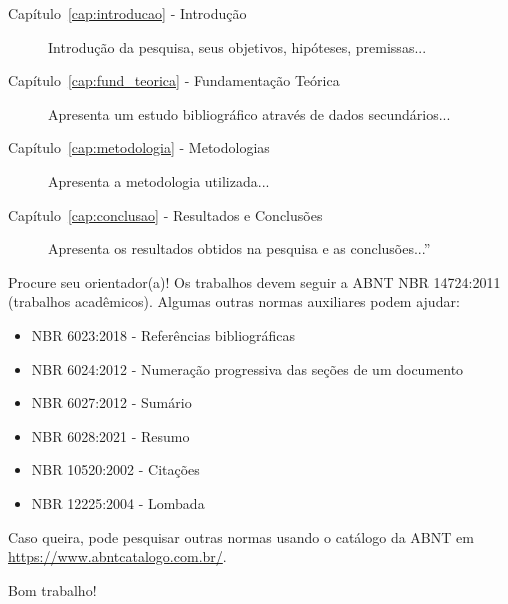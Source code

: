 \begin{description}
    \item[Capítulo~\ref{cap:introducao} - Introdução] Introdução da pesquisa, seus objetivos, hipóteses, premissas...
    
    \item[Capítulo~\ref{cap:fund_teorica} - Fundamentação Teórica] Apresenta um estudo bibliográfico através de dados secundários...
    
    \item[Capítulo~\ref{cap:metodologia} - Metodologias] Apresenta a metodologia utilizada...
    
    \item[Capítulo~\ref{cap:conclusao} - Resultados e Conclusões] Apresenta os resultados obtidos na pesquisa e as conclusões...''
\end{description}

Procure seu orientador(a)! Os trabalhos devem seguir a ABNT NBR 14724:2011 (trabalhos acadêmicos). Algumas outras normas auxiliares podem ajudar:

\begin{itemize}
    \item NBR 6023:2018 - Referências bibliográficas
    \item NBR 6024:2012 - Numeração progressiva das seções de um documento
    \item NBR 6027:2012 - Sumário
    \item NBR 6028:2021 - Resumo
    \item NBR 10520:2002 - Citações
    \item NBR 12225:2004 - Lombada
\end{itemize}

Caso queira, pode pesquisar outras normas usando o catálogo da ABNT em \url{https://www.abntcatalogo.com.br/}.

Bom trabalho!
